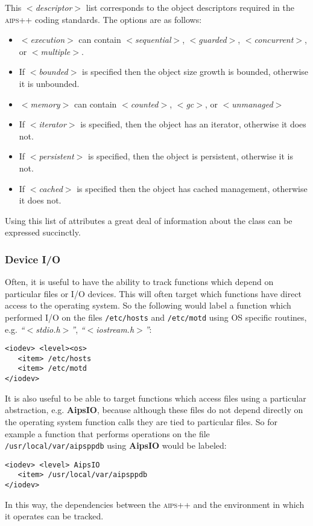 This \textit{$<$descriptor$>$} list corresponds to the object descriptors required
in the \textsc{aips++} coding standards. The options are as follows:
\begin{itemize}
\item
\textit{$<$execution$>$} can contain \textit{$<$sequential$>$}, \textit{$<$guarded$>$}, 
\textit{$<$concurrent$>$}, or \textit{$<$multiple$>$}. 
\item
If \textit{$<$bounded$>$} is specified then the object size growth is bounded, 
otherwise it is unbounded.
\item
\textit{$<$memory$>$} can contain \textit{$<$counted$>$}, \textit{$<$gc$>$}, or \textit{$<$unmanaged$>$}
\item
If \textit{$<$iterator$>$} is specified, then the object has an iterator, otherwise
it does not.
\item
If \textit{$<$persistent$>$} is specified, then the object is persistent, otherwise
it is not.
\item
If \textit{$<$cached$>$} is specified then the object has cached management, otherwise
it does not.
\end{itemize}
\noindent
Using this list of attributes a great deal of information about the class
can be expressed succinctly.

\subsubsection*{Device I/O}

Often, it is useful to have the ability to track functions which depend
on particular files or I/O devices. This will often target which functions
have direct access to the operating system. So the following would label
a function which performed I/O on the files \texttt{/etc/hosts} 
and \texttt{/etc/motd} using OS specific routines, e.g. \emph{``$<$stdio.h$>$''},
\emph{``$<$iostream.h$>$''}:
\begin{verbatim}
<iodev> <level><os>
   <item> /etc/hosts
   <item> /etc/motd
</iodev>
\end{verbatim}
\noindent
It is also useful to be able to target functions which access files
using a particular abstraction, e.g. \textbf{AipsIO}, because although these
files do not depend directly on the operating system function calls they
are tied to particular files. So for example a function that performs
operations on the file \texttt{/usr/local/var/aipsppdb} using \textbf{AipsIO}
would be labeled:
\begin{verbatim}
<iodev> <level> AipsIO
   <item> /usr/local/var/aipsppdb
</iodev>
\end{verbatim}
\noindent
In this way, the dependencies between the \textsc{aips++} and the environment
in which it operates can be tracked.

